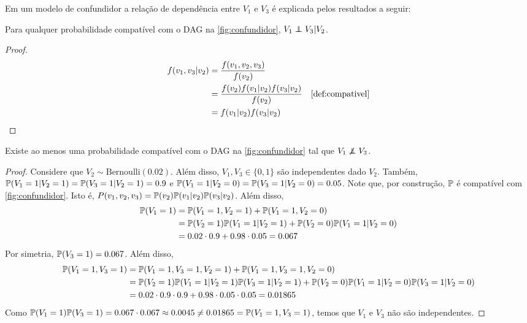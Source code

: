 Em um modelo de confundidor 
a relação de dependência entre 
$V_1$ e $V_3$ é explicada pelos
resultados a seguir:

\begin{lemma}
 \label{lem:conf-ind}
 Para qualquer probabilidade compatível com 
 o DAG na \cref{fig:confundidor},
 $V_1 \ind V_3 | V_2$.
\end{lemma}

\begin{proof}
 \begin{align*}
  f(v_1,v_3|v_2) 
  &= \frac{f(v_1,v_2,v_3)}{f(v_2)} \\
  &= \frac{f(v_2)f(v_1|v_2)f(v_3|v_2)}{f(v_2)} 
  & \text{\cref{def:compativel}} \\
  &= f(v_1|v_2)f(v_3|v_2)
 \end{align*}
\end{proof}

\begin{lemma}
 \label{lem:conf-dep}
 Existe ao menos uma probabilidade compatível com
 o DAG na \cref{fig:confundidor} tal que
 $V_1 \not\ind V_3$.
\end{lemma}

\begin{proof}
 Considere que $V_2 \sim \text{Bernoulli}(0.02)$.
 Além disso, $V_1, V_3 \in \{0,1\}$ são independentes dado $V_2$. 
 Também,
 $\P(V_1 = 1|V_2 = 1) = \P(V_3 = 1|V_2 = 1) = 0.9$ e
 $\P(V_1 = 1|V_2 = 0) = \P(V_3 = 1|V_2 = 0) = 0.05$.
 Note que, por construção, $\P$ é 
 compatível com \cref{fig:confundidor}.
 Isto é, $P(v_1,v_2,v_3) = \P(v_2)\P(v_1|v_2)\P(v_3|v_2)$.
 Além disso,
 \begin{align*}
  \P(V_1 = 1) &= \P(V_1 = 1, V_2 = 1) + \P(V_1 = 1, V_2 = 0) \\
              &= \P(V_2=1)\P(V_1=1|V_2=1)
               +\P(V_2=0)\P(V_1=1|V_2=0) \\
              &= 0.02 \cdot 0.9 + 0.98 \cdot 0.05= 0.067
 \end{align*}
 Por simetria, $\P(V_3=1) = 0.067$. Além disso,
 \begin{align*}
  \P(V_1 = 1, V_3 = 1)
  &= \P(V_1 = 1, V_3 = 1, V_2 = 1) 
  +  \P(V_1 = 1, V_3 = 1, V_2 = 0) \\
  &= \P(V_2 = 1)\P(V_1 = 1|V_2 = 1)\P(V_3 = 1|V_2 = 1)
  +  \P(V_2 = 0)\P(V_1 = 1|V_2 = 0)\P(V_3 = 1|V_2 = 0) \\
  &= 0.02 \cdot 0.9 \cdot 0.9 + 0.98 \cdot 0.05 \cdot 0.05 = 0.01865
 \end{align*}
 Como $\P(V_1=1)\P(V_3=1) = 0.067 \cdot 0.067 \approx 0.0045 \neq 0.01865 = \P(V_1=1,V_3=1)$,
 temos que $V_1$ e $V_3$ não são independentes.
\end{proof}

